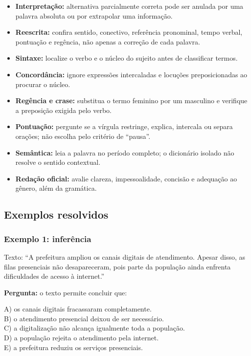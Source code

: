 \documentclass[11pt,a4paper]{article}
\begin{document}
\begin{itemize}
  \item \textbf{Interpretação:} alternativa parcialmente correta pode ser anulada por uma palavra absoluta ou por extrapolar uma informação.
  \item \textbf{Reescrita:} confira sentido, conectivo, referência pronominal, tempo verbal, pontuação e regência, não apenas a correção de cada palavra.
  \item \textbf{Sintaxe:} localize o verbo e o núcleo do sujeito antes de classificar termos.
  \item \textbf{Concordância:} ignore expressões intercaladas e locuções preposicionadas ao procurar o núcleo.
  \item \textbf{Regência e crase:} substitua o termo feminino por um masculino e verifique a preposição exigida pelo verbo.
  \item \textbf{Pontuação:} pergunte se a vírgula restringe, explica, intercala ou separa orações; não escolha pelo critério de “pausa”.
  \item \textbf{Semântica:} leia a palavra no período completo; o dicionário isolado não resolve o sentido contextual.
  \item \textbf{Redação oficial:} avalie clareza, impessoalidade, concisão e adequação ao gênero, além da gramática.
\end{itemize}

\subsection*{Exemplos resolvidos}

\subsubsection*{Exemplo 1: inferência}

Texto: “A prefeitura ampliou os canais digitais de atendimento. Apesar disso, as filas presenciais não desapareceram, pois parte da população ainda enfrenta dificuldades de acesso à internet.”

\textbf{Pergunta:} o texto permite concluir que:

A) os canais digitais fracassaram completamente. \\ B) o atendimento presencial deixou de ser necessário. \\ C) a digitalização não alcança igualmente toda a população. \\ D) a população rejeita o atendimento pela internet. \\ E) a prefeitura reduziu os serviços presenciais.
\end{document}
